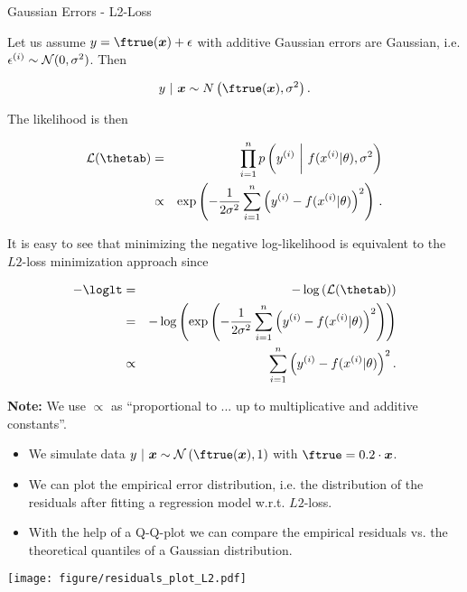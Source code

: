\begin{vbframe}{Gaussian Errors - L2-Loss} 

Let us assume $y = \ftrue(\xv) + \eps$ with additive Gaussian errors are Gaussian, i.e. $\epsilon^{(i)} \sim \mathcal{N}(0, \sigma^2)$. Then

$$y~|~\xv \sim N\left(\ftrue(\xv), \sigma^2\right).$$


The likelihood is then 

\begin{eqnarray*}
\LL(\thetab) &=& \prod_{i=1}^n \pdf\left(\yi ~\bigg|~ \fxit, \sigma^2\right) \\ &\propto& \exp\left(-\frac{1}{2\sigma^2}\sumin \left(\yi - \fxit\right)^2\right)\,.
\end{eqnarray*}

\framebreak 

It is easy to see that minimizing the negative log-likelihood is equivalent to the $L2$-loss minimization approach since

\begin{eqnarray*}
- \loglt &=& - \log\left(\LL(\thetab)\right) \\
&=& - \log\left(\exp\left(-\frac{1}{2\sigma^2}\sumin \left(\yi - \fxit\right)^2\right)\right) \\
&\propto& \sumin \left(\yi - \fxit\right)^2.
\end{eqnarray*}


\begin{footnotesize}
\textbf{Note:} We use $\propto$ as \enquote{proportional to ... up to multiplicative and additive constants}. 
\end{footnotesize}

\framebreak 

\begin{footnotesize}
\begin{itemize}
	\item We simulate data $y ~|~\xv \sim \mathcal{N}\left(\ftrue(\xv), 1\right)$ with $\ftrue = 0.2 \cdot \xv$. 
\item We can plot the empirical error distribution, i.e. the distribution of the residuals after fitting a regression model w.r.t. $L2$-loss.
\item With the help of a Q-Q-plot we can compare the empirical residuals vs. the theoretical quantiles of a Gaussian distribution.  
\end{itemize}
\end{footnotesize}

\texttt{[image: figure/residuals\_plot\_L2.pdf]}

\end{vbframe}

\endlecture

